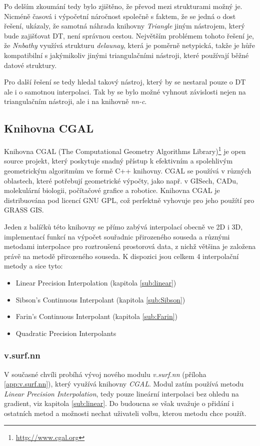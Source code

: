\documentclass[12pt,a4paper]{article}
\begin{document}
Po delším zkoumání tedy bylo zjištěno, že převod mezi strukturami
možný je. Nicméně časová i výpočetní náročnost společně s faktem, že
se jedná o dost  řešení, ukázaly, že samotná náhrada
knihovny \emph{Triangle} jiným nástrojem, který bude zajišťovat DT,
není správnou cestou. Největším problémem tohoto řešení je, že
\emph{Nnbathy} využívá strukturu \emph{delaunay}, která je poměrně
netypická, takže je hůře kompatibilní s jakýmikoliv jinými
triangulačními nástroji, které používají běžné datové struktury.

Pro další řešení se tedy hledal takový nástroj, který by se nestaral
pouze o DT ale i o samotnou interpolaci. Tak by se bylo možné vyhnout
závislosti nejen na triangulačním nástroji, ale i na knihovně
\emph{nn-c}.

\newpage
\subsection{Knihovna CGAL}
Knihovna CGAL (The Computational Geometry Algorithms
Library)\footnote{\url{http://www.cgal.org}} je open source projekt, který
poskytuje snadný přístup k efektivním a spolehlivým geometrickým
algoritmům ve formě C++ knihovny. CGAL se používá v různých oblastech,
které potřebují geometrické výpočty, jako např. v GISech, CADu,
molekulární biologii, počítačové grafice a robotice. Knihovna CGAL je
distribuována pod licencí GNU GPL, což perfektně vyhovuje pro jeho
použítí pro GRASS GIS.

Jeden z balíčků této knihovny se přímo zabývá interpolací obecně ve 2D
i 3D, implementací funkcí na výpočet souřadnic přirozeného souseda a
různými metodami interpolace pro roztroušená prostorová data, z nichž
většina je založena právě na metodě přirozeného souseda. K dispozici
jsou celkem 4 interpolační metody a sice tyto:
\begin{itemize}
\item Linear Precision Interpolation (kapitola \ref{sub:linear})
\item Sibson's Continuous Interpolant (kapitola \ref{sub:Sibson})
\item Farin's Continuous Interpolant (kapitola \ref{sub:Farin})
\item Quadratic Precision Interpolants
\end{itemize}

\subsubsection{v.surf.nn}
\label{subsub:v.surf.nn}
V současné chvíli probíhá vývoj nového modulu \emph{v.surf.nn} (příloha \ref{app:v.surf.nn}), který
využívá knihovny \emph{CGAL}. Modul zatím používá metodu \emph{Linear Precision
Interpolation}, tedy pouze lineární interpolaci bez ohledu na gradient, viz kapitola \ref{sub:linear}. Do budoucna se
však uvažuje o přidání i ostatních metod a možnosti nechat uživateli volbu,
kterou metodu chce použít.
\end{document}
